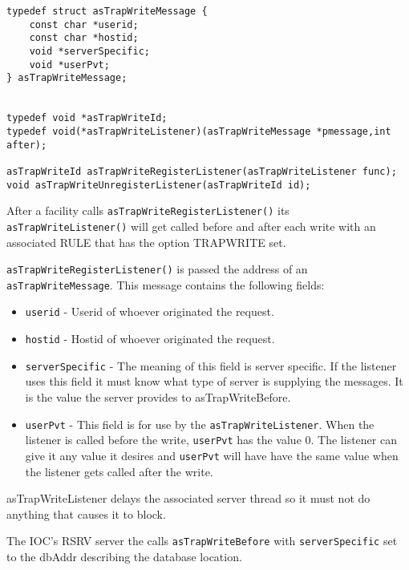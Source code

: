 \begin{verbatim}typedef struct asTrapWriteMessage {
    const char *userid;
    const char *hostid;
    void *serverSpecific;
    void *userPvt;
} asTrapWriteMessage;


typedef void *asTrapWriteId;
typedef void(*asTrapWriteListener)(asTrapWriteMessage *pmessage,int after);

asTrapWriteId asTrapWriteRegisterListener(asTrapWriteListener func);
void asTrapWriteUnregisterListener(asTrapWriteId id);
\end{verbatim}
After a facility calls \verb|asTrapWriteRegisterListener()| its \verb|asTrapWriteListener()| will get called before 
and after each write with an associated RULE that has the option TRAPWRITE  set.

\verb|asTrapWriteRegisterListener()| is passed the address of an \verb|asTrapWriteMessage|. This message contains 
the following fields:

\begin{itemize}\item  \verb|userid| - Userid of whoever originated the request.

\item  \verb|hostid| - Hostid of whoever originated the request.

\item \verb|serverSpecific| - The meaning of this field is server specific. If the listener uses this field it must know what 
type of server is supplying the messages. It is the value the server provides to asTrapWriteBefore.

\item \verb|userPvt| - This field is for use by the \verb|asTrapWriteListener|. When the listener is called before the write,  
\verb|userPvt| has the value 0. The listener can give it any value it desires and \verb|userPvt| will have have the same 
value when the listener gets called after the write.

\end{itemize}asTrapWriteListener delays the associated server thread so it must not do anything that causes it to block.

The IOC's RSRV server the calls  \verb|asTrapWriteBefore| with \verb|serverSpecific|  set to the dbAddr describing the 
database location.

